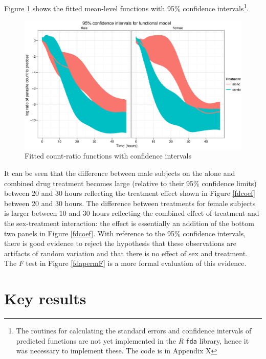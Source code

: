 Figure \ref{fdfitted} shows the fitted mean-level functions with 95\% confidence intervals\footnote{The routines for calculating the standard errors and confidence intervals of predicted functions are not yet implemented in the \emph{R} \texttt{fda} library, hence it was necessary to implement these. The code is in Appendix X}.
\begin{figure}[p]
\includegraphics[width=150mm]{lprr2i.eps} 
\caption{Fitted count-ratio functions with confidence intervals}
\label{fdfitted}
\end{figure}
It can be seen that the difference between male subjects on the alone and combined drug treatment becomes large (relative to their 95\% confidence limits) between 20 and 30 hours reflecting the treatment effect shown in Figure \ref{fdcoef} between 20 and 30 hours. The difference between treatments for female subjects is larger between 10 and 30 hours reflecting the combined effect of treatment and the sex-treatment interaction: the effect is essentially an addition of the bottom two panels in Figure \ref{fdcoef}. With reference to the 95\% confidence intervals, there is good evidence to reject the hypothesis that these observations are artifacts of random variation and that there is no effect of sex and treatment. The $F$ test in Figure \ref{fdapermF} is a more formal evaluation of this evidence.

\section{Key results}
